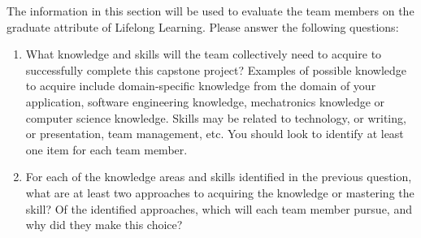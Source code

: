 \documentclass[12pt]{article}
\begin{document}
The information in this section will be used to evaluate the team members on the
graduate attribute of Lifelong Learning.  Please answer the following questions:

\begin{enumerate}
  \item What knowledge and skills will the team collectively need to acquire to
  successfully complete this capstone project?  Examples of possible knowledge
  to acquire include domain-specific knowledge from the domain of your
  application, software engineering knowledge, mechatronics knowledge or
  computer science knowledge.  Skills may be related to technology, or writing,
  or presentation, team management, etc.  You should look to identify at
  least one item for each team member.
  \item For each of the knowledge areas and skills identified in the previous
  question, what are at least two approaches to acquiring the knowledge or
  mastering the skill?  Of the identified approaches, which will each team
  member pursue, and why did they make this choice?
\end{enumerate}
\end{document}
